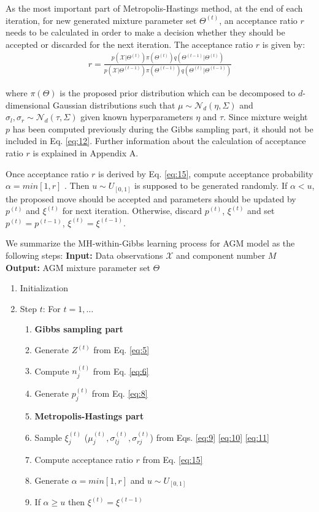 \documentclass[conference]{llncs}
\begin{document}
As the most important part of Metropolis-Hastings method, at the end of each iteration, for new generated mixture parameter set $\Theta^{(t)}$, an acceptance ratio $r$ needs to be calculated in order to make a decision whether they should be accepted or discarded for the next iteration. The acceptance ratio $r$ is given by:
\begin{align}
r = \frac{p(\mathcal{X}|\Theta^{(t)})\pi(\Theta^{(t)})q(\Theta^{(t-1)}|\Theta^{(t)})}{p(\mathcal{X}|\Theta^{(t-1)})\pi(\Theta^{(t-1)})q(\Theta^{(t)}|\Theta^{(t-1)})}
\label{eq:12}
\end{align}

where $\pi(\Theta)$ is the proposed prior distribution which can be decomposed to $d$-dimensional Gaussian distributions such that $\mu \sim \mathcal{N}_d(\eta,\Sigma)$ and $\sigma_l, \sigma_r \sim \mathcal{N}_d(\tau,\Sigma)$ given known hyperparameters $\eta$ and $\tau$. Since mixture weight $p$ has been computed previously during the Gibbs sampling part, it should not be included in Eq. \eqref{eq:12}. Further information about the calculation of acceptance ratio $r$ is explained in Appendix A.

Once acceptance ratio $r$ is derived by Eq. \eqref{eq:15}, compute acceptance probability $\alpha = min[1,r]$ \cite{b13}. Then $u \sim U_{[0,1]}$ is supposed to be generated randomly. If $\alpha < u$, the proposed move should be accepted and parameters should be updated by $p^{(t)}$ and $\xi^{(t)}$ for next iteration. Otherwise, discard $p^{(t)}$, $\xi^{(t)}$ and set $p^{(t)} = p^{(t-1)}$, $\xi^{(t)} = \xi^{(t-1)}$.

We summarize the MH-within-Gibbs learning process for AGM model as the following steps:
\bigbreak
\noindent\textbf{Input:} Data observations $\mathcal{X}$ and component number $M$ \\
\textbf{Output:} AGM mixture parameter set $\Theta$
\bigbreak

\begin{enumerate}
\item Initialization
\item Step $t$: For $t = 1,\ldots$
\begin{enumerate}
\item[]\textbf{Gibbs sampling part}
\item Generate $Z^{(t)}$ from Eq. \eqref{eq:5}
\item Compute $n_j^{(t)}$ from Eq. \eqref{eq:6}
\item Generate $p_j^{(t)}$ from Eq. \eqref{eq:8}
\item[] \textbf{Metropolis-Hastings part}
\item Sample $\xi_j^{(t)}$ ($\mu_j^{(t)}, \sigma_{lj}^{(t)}, \sigma_{rj}^{(t)}$) from Eqs. \eqref{eq:9} \eqref{eq:10} \eqref{eq:11}
\item Compute acceptance ratio $r$ from Eq. \eqref{eq:15}
\item Generate $\alpha = min[1,r]$ and $u \sim U_{[0,1]}$
\item If $\alpha \geq u$ then $\xi^{(t)} = \xi^{(t-1)}$
\end{enumerate}
\end{enumerate}
\end{document}

